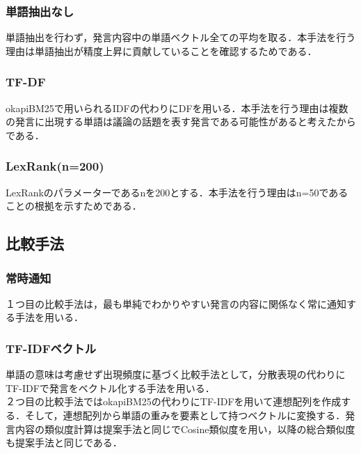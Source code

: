 \subsubsection*{ 単語抽出なし}
単語抽出を行わず，発言内容中の単語ベクトル全ての平均を取る．本手法を行う理由は単語抽出が精度上昇に貢献していることを確認するためである．
\subsubsection*{ TF-DF}
okapiBM25で用いられるIDFの代わりにDFを用いる．本手法を行う理由は複数の発言に出現する単語は議論の話題を表す発言である可能性があると考えたからである．
\subsubsection*{ LexRank(n=200)}
LexRankのパラメーターであるnを200とする．本手法を行う理由はn=50であることの根拠を示すためである．

\subsection{比較手法}
\subsubsection*{ 常時通知}
１つ目の比較手法は，最も単純でわかりやすい発言の内容に関係なく常に通知する手法を用いる．
\subsubsection*{ TF-IDFベクトル}
単語の意味は考慮せず出現頻度に基づく比較手法として，分散表現の代わりにTF-IDFで発言をベクトル化する手法を用いる．\\
２つ目の比較手法ではokapiBM25の代わりにTF-IDFを用いて連想配列を作成する．そして，連想配列から単語の重みを要素として持つベクトルに変換する．発言内容の類似度計算は提案手法と同じでCosine類似度を用い，以降の総合類似度も提案手法と同じである．

